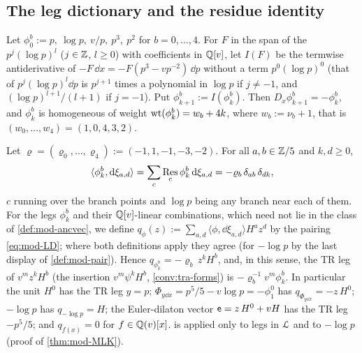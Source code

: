 \subsection{The leg dictionary and the residue identity}
\label{sec:mod-legs}

\begin{defn}
\label{def:mod-legs}
Let $\phi^b_0:=p,\ \log p,\ v/p,\ p^3,\ p^2$ for $b=0,\dots,4$. For $F$ in the span of the $p^j(\log p)^l$ ($j\in\mathbb{Z}$, $l\geq 0$) with coefficients in $\mathbb{Q}[v]$, let $I(F)$ be the termwise antiderivative of $-F\,\dd x=-F(p^3-vp^{-2})\,\dd p$ without a term $p^0(\log p)^0$ (that of $p^j(\log p)^l\dd p$ is $p^{j+1}$ times a polynomial in $\log p$ if $j\neq -1$, and $(\log p)^{l+1}/(l+1)$ if $j=-1$). Put $\phi^b_{k+1}:=I(\phi^b_k)$. Then $D_x\phi^b_{k+1}=-\phi^b_k$, and $\phi^b_k$ is homogeneous of weight $\operatorname{wt}(\phi^b_k)=w_b+4k$, where $w_b:=\nu_b+1$, that is $(w_0,\dots,w_4)=(1,0,4,3,2)$.
\end{defn}

\begin{prop}
\label{prop:mod-LD}
Let $\varrho=(\varrho_0,\dots,\varrho_4):=(-1,1,-1,-3,-2)$. For all $a,b\in\mathbb{Z}/5$ and $k,d\geq 0$,
\begin{equation}
\label{eq:mod-LD}
\langle\phi^b_k,\mathrm{d}\xi_{a,d}\rangle=\sum_c\operatorname*{Res}_{c}\phi^b_k\,\mathrm{d}\xi_{a,d}=-\varrho_b\,\delta_{ab}\,\delta_{dk},
\end{equation}
$c$ running over the branch points and $\log p$ being any branch near each of them. For the legs $\phi^b_k$ and their $\mathbb{Q}[v]$-linear combinations, which need not lie in the class of \cref{def:mod-ancvec}, we define $q_\phi(z):=\sum_{a,d}\langle\phi,\dd\xi_{a,d}\rangle H^az^d$ by the pairing \eqref{eq:mod-LD}; where both definitions apply they agree (for $-\log p$ by the last display of \cref{def:mod-pair}). Hence $q_{\phi^b_k}=-\varrho_b\,z^kH^b$, and, in this sense, the TR leg of $v^mz^kH^b$ (the insertion $v^m\psi^kH^b$, \cref{conv:tra-forms}) is $-\varrho_b^{-1}v^m\phi^b_k$. In particular the unit $H^0$ has the TR leg $y=p$; $\Phi_{y\dd x}=p^5/5-v\log p=-\phi^0_1$ has $q_{\Phi_{y\dd x}}=-z\,H^0$; $-\log p$ has $q_{-\log p}=H$; the Euler-dilaton vector $\mathsf{e}=z\,H^0+vH$ has the TR leg $-p^5/5$; and $q_{f(x)}=0$ for $f\in\mathbb{Q}(v)[x]$.  is applied only to legs in $\mathcal{L}$ and to $-\log p$ (proof of \cref{thm:mod-MLK}).
\end{prop}


